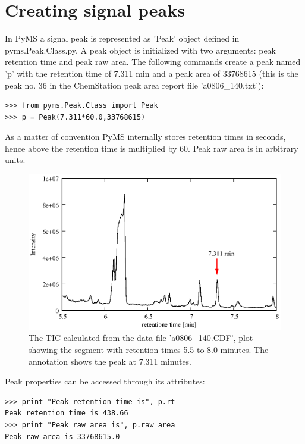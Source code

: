 \section{Creating signal peaks}


In PyMS a signal peak is represented as 'Peak' object defined in
pyms.Peak.Class.py. A peak object is initialized with two arguments:
peak retention time and peak raw area. The following commands create
a peak named 'p' with the retention time of 7.311 min and a peak area
of 33768615 (this is the peak no. 36 in the ChemStation peak area report
file 'a0806\_140.txt'):

\begin{verbatim}
>>> from pyms.Peak.Class import Peak
>>> p = Peak(7.311*60.0,33768615)
\end{verbatim}

\noindent
As a matter of convention PyMS internally stores retention times in seconds,
hence above the retention time is multiplied by 60. Peak raw area is in
arbitrary units.

\begin{figure}[htp]
\begin{center}
\includegraphics{graphics/tic_with_peak/tic_with_peak.eps}
\caption{The TIC calculated from the data file 'a0806\_140.CDF', plot showing the
segment with retention times 5.5 to 8.0 minutes. The annotation shows the peak at
7.311 minutes.}
\label{fig:mass-spectrum}
\end{center}
\end{figure}

Peak properties can be accessed through its attributes:

\begin{verbatim}
>>> print "Peak retention time is", p.rt
Peak retention time is 438.66
>>> print "Peak raw area is", p.raw_area
Peak raw area is 33768615.0
\end{verbatim}

